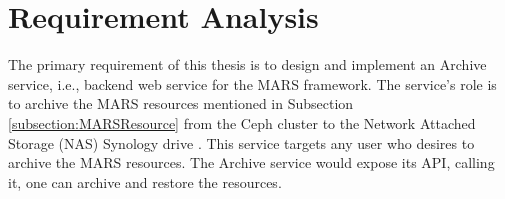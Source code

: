 \newpage
\chapter{Requirement Analysis}
\label{chap:ReqAnalysis}
 The primary requirement of this thesis is to design and implement an Archive service, i.e., backend web service for the MARS framework. The service's role is to
 archive the MARS resources mentioned in Subsection \ref{subsection:MARSResource} from the Ceph cluster \cite{Ceph} to the 
 Network Attached Storage (NAS) Synology drive \cite{Synology}. This service targets any user who desires to archive the MARS resources. The Archive service would expose its API, calling it, one can archive and restore the resources. 


\newpage

